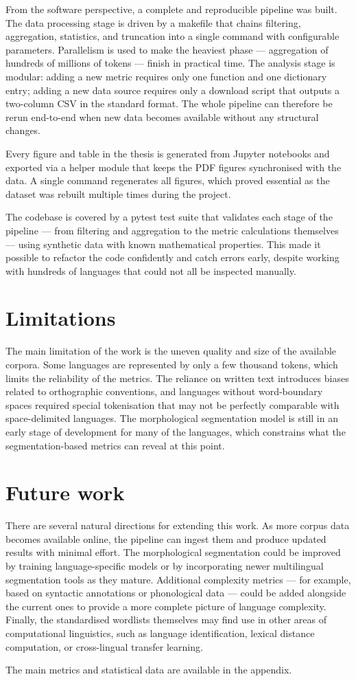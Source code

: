 From the software perspective, a complete and reproducible pipeline was built. The data processing stage is driven by a makefile that chains filtering, aggregation, statistics, and truncation into a single command with configurable parameters. Parallelism is used to make the heaviest phase --- aggregation of hundreds of millions of tokens --- finish in practical time. The analysis stage is modular: adding a new metric requires only one function and one dictionary entry; adding a new data source requires only a download script that outputs a two-column CSV in the standard format. The whole pipeline can therefore be rerun end-to-end when new data becomes available without any structural changes.

Every figure and table in the thesis is generated from Jupyter notebooks and exported via a helper module that keeps the PDF figures synchronised with the data. A single command regenerates all figures, which proved essential as the dataset was rebuilt multiple times during the project.

The codebase is covered by a pytest test suite that validates each stage of the pipeline --- from filtering and aggregation to the metric calculations themselves --- using synthetic data with known mathematical properties. This made it possible to refactor the code confidently and catch errors early, despite working with hundreds of languages that could not all be inspected manually.

\section*{Limitations}

The main limitation of the work is the uneven quality and size of the available corpora. Some languages are represented by only a few thousand tokens, which limits the reliability of the metrics. The reliance on written text introduces biases related to orthographic conventions, and languages without word-boundary spaces required special tokenisation that may not be perfectly comparable with space-delimited languages. The morphological segmentation model is still in an early stage of development for many of the languages, which constrains what the segmentation-based metrics can reveal at this point.

\section*{Future work}

There are several natural directions for extending this work. As more corpus data becomes available online, the pipeline can ingest them and produce updated results with minimal effort. The morphological segmentation could be improved by training language-specific models or by incorporating newer multilingual segmentation tools as they mature. Additional complexity metrics --- for example, based on syntactic annotations or phonological data --- could be added alongside the current ones to provide a more complete picture of language complexity. Finally, the standardised wordlists themselves may find use in other areas of computational linguistics, such as language identification, lexical distance computation, or cross-lingual transfer learning.

The main metrics and statistical data are available in the appendix.